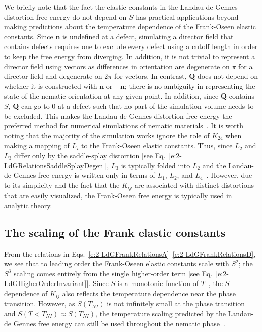 We briefly note that the fact the elastic constants in the Landau-de Gennes distortion free energy do not depend on $S$ has practical applications beyond making predictions about the temperature dependence of the Frank-Oseen elastic constants.
Since $\mathbf{n}$ is undefined at a defect, simulating a director field that contains defects requires one to exclude every defect using a cutoff length in order to keep the free energy from diverging.
In addition, it is not trivial to represent a director field using vectors as differences in orientation are degenerate on $\pi$ for a director field and degenerate on $2\pi$ for vectors.
In contrast, $\mathbf{Q}$ does not depend on whether it is constructed with $\mathbf{n}$ or $-\mathbf{n}$; there is no ambiguity in representing the state of the nematic orientation at any given point.
In addition, since $\mathbf{Q}$ contains $S$, $\mathbf{Q}$ can go to 0 at a defect such that no part of the simulation volume needs to be excluded.
This makes the Landau-de Gennes distortion free energy the preferred method for numerical simulations of nematic materials~\cite{RN190}.
It is worth noting that the majority of the simulation works ignore the role of $K_{24}$ when making a mapping of $L_i$ to the Frank-Oseen elastic constants.
Thus, since $L_2$ and $L_3$ differ only by the saddle-splay distortion [see Eq.~\ref{e:2-LdGRelationsSaddleSplayDegen}], $L_3$ is typically folded into $L_2$ and the Landau-de Gennes free energy is written only in terms of $L_1$, $L_2$, and $L_4$~\cite{RN198,RN190}.
However, due to its simplicity and the fact that the $K_{ij}$ are associated with distinct distortions that are easily visualized, the Frank-Oseen free energy is typically used in analytic theory.\\


\subsection{The scaling of the Frank elastic constants}
From the relations in Eqs.~\ref{e:2-LdGFrankRelationsA}--\ref{e:2-LdGFrankRelationsD}, we see that to leading order the Frank-Oseen elastic constants scale with $S^2$; the $S^3$ scaling comes entirely from the single higher-order term [see Eq.~\ref{e:2-LdGHigherOrderInvariant}].
Since $S$ is a monotonic function of $T$~\cite{RN33}, the $S$-dependence of $K_{ij}$ also reflects the temperature dependence near the phase transition.
However, as $S(T_{NI})$ is not infinitely small at the phase transition and $S(T < T_{NI}) \approx S(T_{NI})$, the temperature scaling predicted by the Landau-de Gennes free energy can still be used throughout the nematic phase~\cite{RN198}.

